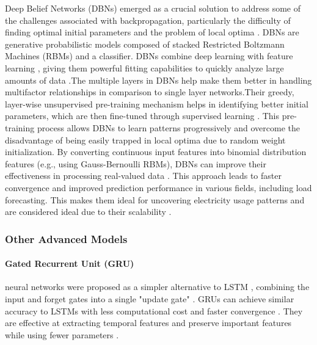  Deep Belief Networks (DBNs) emerged as a crucial solution to address some of the challenges associated with backpropagation, particularly the difficulty of finding optimal initial parameters and the problem of local optima \cite{kong2019improved}. DBNs are generative probabilistic models composed of stacked Restricted Boltzmann Machines (RBMs) and a classifier. 
 DBNs combine deep learning with feature learning  , giving them powerful fitting capabilities to quickly analyze large amounts of data \cite{kong2019improved}.The multiple layers in DBNs help make them better in handling multifactor relationships in comparison  to single layer networks.Their greedy, layer-wise unsupervised pre-training mechanism helps in identifying better initial parameters, which are then fine-tuned through supervised learning \cite{kong2019improved}.
  This pre-training process allows DBNs to learn patterns progressively and overcome the disadvantage of being easily trapped in local optima due to random weight initialization. By converting continuous input features into binomial distribution features (e.g., using Gauss-Bernoulli RBMs), DBNs can improve their effectiveness in processing real-valued data \cite{kong2019improved}. This approach leads to faster convergence and improved prediction performance in various fields, including load forecasting.   This makes them ideal for uncovering electricity usage patterns and are considered ideal due to their scalability \cite{boopathy2024deep}.
 
 
 \subsubsection{Other Advanced Models}
  
  \paragraph{Gated Recurrent Unit (GRU)} neural networks were proposed as a simpler alternative to LSTM  , combining the input and forget gates into a single "update gate"  \cite{wang2018short}. GRUs can achieve similar accuracy to LSTMs with less computational cost and faster convergence \cite{hiceemdanQteg}. They are effective at extracting temporal features and preserve important features while using fewer parameters \cite{hiceemdanQteg}.
  
